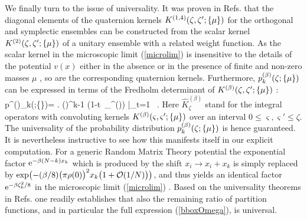 We finally turn to the issue of universality.
It was proven in Refs.\cite{SeV,Wid} that the diagonal
elements of the quaternion kernels
$K^{(1,4)}(\zeta,\zeta';\{\mu\})$
for the orthogonal and symplectic ensembles can be
constructed from the scalar kernel
$K^{(2)}(\zeta,\zeta';\{\mu\})$ of a unitary ensemble
with a related weight function.
As the scalar kernel in the microscopic limit
(\ref{microlim})
is insensitive to the details of the potential $v(x)$
either in the absence \cite{ADMN,KF} or
in the presence of finite and non-zero masses $\mu$ \cite{DN98a},
so are the corresponding quaternion kernels. Furthermore,
${p}^{(\beta)}_k(\zeta;\{\mu\})$ can be expressed in terms of
the Fredholm determinant of $K^{(\beta)}(\zeta,\zeta';\{\mu\})$
\cite{Meh,TW93}:
\beq
{p}^{(\beta)}_k(\zeta;\{\m\})=
\frac{\partial}{\partial \zeta}
\left.
\Bigl(\Bigr)^{k-1}
\det (1-t \,_\zeta^{(\beta)})
\right|_{t=1} ~.
\eeq
Here $\hat{K}_\zeta^{(\beta)}$ stand for the integral operators
with convoluting kernels
$K^{(\beta)}(\varsigma,\varsigma';\{\mu\})$
over an interval $0\leq \varsigma,\varsigma'\leq \zeta$.
The universality of the probability distribution
${p}^{(\beta)}_k(\zeta;\{\mu\})$ is hence guaranteed. It is nevertheless
instructive
to see how this manifests itself in our explicit computation.
For a generic Random Matrix Theory potential
the exponential factor ${\rm e}^{-\beta (N-k) x_k}$
which is produced by the shift $x_i \to x_i +x_k$
is simply replaced by $\exp\bigl(-({\beta}/{8})
\bigl(\pi\rho(0)\bigr)^2 x_k
\bigl(1+{\cal O}(1/N) \bigr)\bigr)$,
and thus yields an identical factor ${\rm e}^{-\beta \zeta_k^2/8}$
in the microscopic limit (\ref{microlim}) \cite{NDW}. Based on the
universality theorems in Refs.\cite{ADMN,SeV} one readily establishes that
also the remaining ratio of partition functions, and in particular the
full expression (\ref{bboxOmega}), is universal. 

